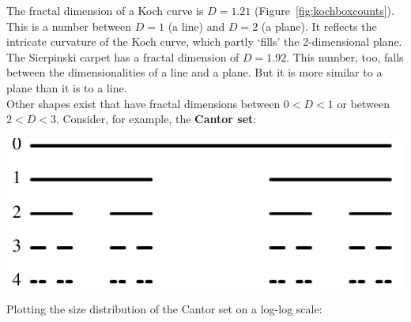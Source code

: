 The fractal dimension of a Koch curve is $D=1.21$
(Figure~\ref{fig:kochboxcounts}). This is a number between $D=1$ (a
line) and $D=2$ (a plane). It reflects the intricate curvature of the
Koch curve, which partly `fills' the 2-dimensional plane.  The
Sierpinski carpet has a fractal dimension of $D=1.92$. This number,
too, falls between the dimensionalities of a line and a plane. But it
is more similar to a plane than it is to a line.\\

Other shapes exist that have fractal dimensions between $0 < D < 1$ or
between $2 < D < 3$. Consider, for example, the \textbf{Cantor set}:

\noindent\begin{minipage}[t][][b]{.4\textwidth}
  \includegraphics[width=\textwidth]{../figures/cantor.pdf}\\
\end{minipage}
\begin{minipage}[t][][t]{.6\textwidth}
  \label{fig:cantor}
\end{minipage}

Plotting the size distribution of the Cantor set on a log-log scale:

